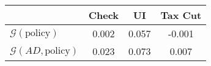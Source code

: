 \begin{tabular}{@{}lccc@{}} 
\toprule 
                          & Check      & UI    & Tax Cut    \\  \midrule 
$\mathcal{G}(\text{policy})$ & 0.002  & 0.057  & -0.001     \\ 
$\mathcal{G}(AD,\text{policy})$ & 0.023  & 0.073  & 0.007     \\ 
\end{tabular}  

